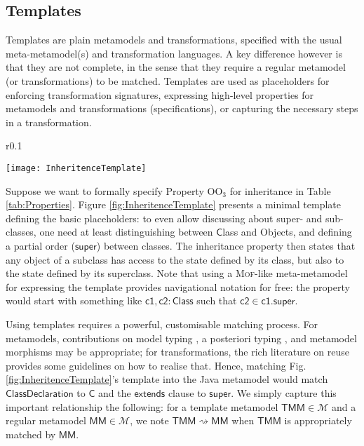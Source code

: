 \subsection{Templates}
\label{sec:Templates}

Templates are plain metamodels and transformations, specified with the usual 
meta-metamodel(s) and transformation languages. A key difference however is 
that they are not complete, in the sense that they require a regular metamodel 
(or transformations) to be matched. Templates are used as placeholders for 
enforcing transformation signatures, expressing high-level properties for 
metamodels and transformations (specifications), or capturing the necessary 
steps in a transformation. 
\begin{wrapfigure}[14]{r}{0.1\textwidth}
  \begin{center}
    \texttt{[image: InheritenceTemplate]}
  \end{center}
  \caption{Simple Class-Property Template for capturing Inheritance.}
  \label{fig:InheritenceTemplate}
\end{wrapfigure}
Suppose we want to formally specify Property $\mbox{OO}_3$ for inheritance in 
Table \ref{tab:Properties}. Figure \ref{fig:InheritenceTemplate} presents a 
minimal template defining the basic placeholders: to even allow discussing 
about super- and sub-classes, one need at least distinguishing between 
$\mathsf{C}$lass and Objects, and defining a partial order ($\mathsf{super}$) 
between classes. The inheritance property then states that any object of a 
subclass has access to the state defined by its class, but also to the state 
defined by its superclass. Note that using a \textsc{Mof}-like meta-metamodel 
for expressing the template provides navigational notation for free: the 
property would start with something like $\mathsf{c1, c2 : Class}$ such that 
$\mathsf{c2} \in \mathsf{c1.super}$.

Using templates requires a powerful, customisable matching process. For 
metamodels, contributions on model typing \cite{J:Degueule-etAl:2017}, a 
posteriori typing \cite{J:deLara-Guerra:2017}, and metamodel morphisms 
\cite{Salay-Mylopoulos-Esterbrook:2008,Duran-Zschaler-Troya:2012} may be 
appropriate; for transformations, the rich literature on reuse 
\cite{J:Kusel-etAl:2015} provides some guidelines on how to realise that. Hence, 
matching Fig. \ref{fig:InheritenceTemplate}'s template into the Java 
metamodel \cite{B:Java:2019} would match $\mathsf{ClassDeclaration}$ to 
$\mathsf{C}$ and the $\mathsf{extends}$ clause to $\mathsf{super}$. 
We simply capture this important relationship the following: for a template 
metamodel $\mathsf{TMM}\in\mathcal{M}$ and a regular metamodel 
$\mathsf{MM}\in\mathcal{M}$, we note $\mathsf{TMM} \rightsquigarrow 
\mathsf{MM}$ when $\mathsf{TMM}$ is appropriately matched by $\mathsf{MM}$.

